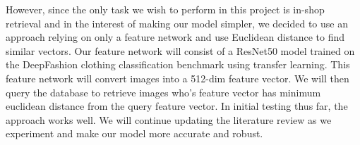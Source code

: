 However, since the only task we wish to perform in this project is in-shop retrieval and in the interest of making our model simpler, we decided to use an approach relying on only a feature network and use Euclidean distance to find similar vectors. Our feature network will consist of a ResNet50 model trained on the DeepFashion clothing classification benchmark using transfer learning. This feature network will convert images into a 512-dim feature vector. We will then query the database to retrieve images who's feature vector has minimum euclidean distance from the query feature vector. In initial testing thus far, the approach works well. We will continue updating the literature review as we experiment and make our model more accurate and robust.

